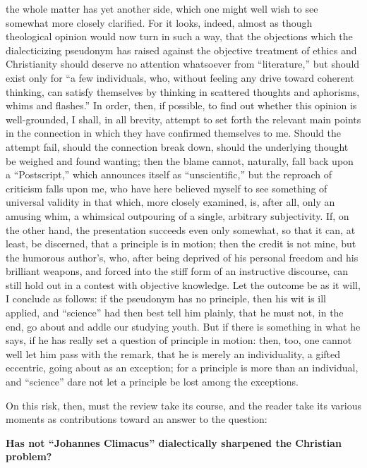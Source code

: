 \documentclass[12pt]{book}
\begin{document}
the whole matter has yet another side, which one might well wish to see somewhat more closely clarified. For it looks, indeed, almost as though theological opinion would now turn in such a way, that the objections which the dialecticizing pseudonym has raised against the objective treatment of ethics and Christianity should deserve no attention whatsoever from ``literature,'' but should exist only for ``a few individuals, who, without feeling any drive toward coherent thinking, can satisfy themselves by thinking in scattered thoughts and aphorisms, whims and flashes.'' In order, then, if possible, to find out whether this opinion is well-grounded, I shall, in all brevity, attempt to set forth the relevant main points in the connection in which they have confirmed themselves to me. Should the attempt fail, should the connection break down, should the underlying thought be weighed and found wanting; then the blame cannot, naturally, fall back upon a ``Postscript,'' which announces itself as ``unscientific,'' but the reproach of criticism falls upon me, who have here believed myself to see something of universal validity in that which, more closely examined, is, after all, only an amusing whim, a whimsical outpouring of a single, arbitrary subjectivity. If, on the other hand, the presentation succeeds even only somewhat, so that it can, at least, be discerned, that a principle is in motion; then the credit is not mine, but the humorous
author's, who, after being deprived of his personal freedom and his brilliant weapons, and forced into the stiff form of an instructive discourse, can still hold out in a contest with objective knowledge. Let the outcome be as it will, I conclude as follows: if the pseudonym has no principle, then his wit is ill applied, and ``science'' had then best tell him plainly, that he must not, in the end, go about and addle our studying youth. But if there is something in what he says, if he has really set a question of principle in motion: then, too, one cannot well let him pass with the remark, that he is merely an individuality, a gifted eccentric, going about as an exception; for a principle is more than an individual, and ``science'' dare not let a principle be lost among the exceptions.

On this risk, then, must the review take its course, and the reader take its various moments as contributions toward an answer to the question:

\begin{center}
{\large\bfseries Has not ``Johannes Climacus'' dialectically sharpened
the Christian problem?\par}
\end{center}
\end{document}
